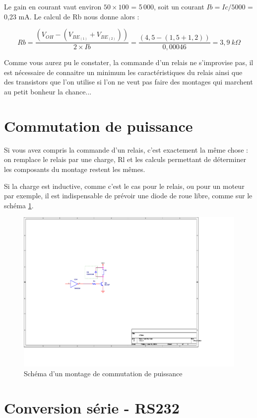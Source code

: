 \documentclass[a4paper]{article}
\begin{document}
Le gain en courant vaut environ $50\times{}100$ = 5\,000, soit un courant $Ib = Ic/5000$ = 0,23 mA. Le calcul de Rb nous donne alors :

\[Rb = \frac{(V_{OH} - (V_{BE_{(1)}} + V_{BE_{(2)}}))}{2\times{}Ib} = \frac{(4,5 - (1,5 + 1,2))}{0,00046} = 3,9\ k\Omega\]

Comme vous aurez pu le constater, la commande d'un relais ne s'improvise pas, il est nécessaire de connaitre un minimum les caractéristiques du relais ainsi que des transistors que l'on utilise si l'on ne veut pas faire des montages qui marchent au petit bonheur la chance...

\section{Commutation de puissance}

Si vous avez compris la commande d'un relais, c'est exactement la même chose : on remplace le relais par une charge, Rl et les calculs permettant de déterminer les composants du montage restent les mêmes.

Si la charge est inductive, comme c'est le cas pour le relais, ou pour un moteur par exemple, il est indispensable de prévoir une diode de roue libre, comme sur le schéma \ref{Commutation_de_puissance}.

\begin{figure}[H]
	\centering
	\includegraphics[scale=1.00]{Images/Commutation_de_puissance}
	\caption{Schéma d'un montage de commutation de puissance
		\label{Commutation_de_puissance}}
\end{figure}

\section{Conversion série - RS232}
\end{document}
